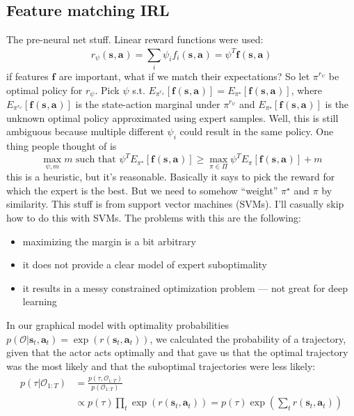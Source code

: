 \documentclass{report}
\begin{document}
\subsection{Feature matching IRL}
The pre-neural net stuff.
Linear reward functions were used:
\begin{equation}
		r_{ \psi } (\bm{s}_{}, \bm{a}_{} ) =
		\sum_{i}^{} \psi_{ i } f_{ i } (\bm{s}_{}, \bm{a}_{} ) = \psi^{ T } \bm{f}_{} (\bm{s}_{}, \bm{a}_{} )
\end{equation}
if features $ \bm{f}_{}  $ are important, what if we match their expectations?
So let $ \pi^{ r_{ \psi } }  $ be optimal policy for $ r_{ \psi }  $.
Pick $ \psi  $ s.t. $   
E_{ \pi^{ r_{ \psi } } } \left[ \bm{f}_{} (\bm{s}_{}, \bm{a}_{} )  \right] 
= E_{ \pi^{ \star } } \left[ \bm{f}_{} (\bm{s}_{}, \bm{a}_{} ) \right] $,
where $ E_{ \pi^{ r_{ \psi } } } \left[ \bm{f}_{} (\bm{s}_{}, \bm{a}_{} )  \right]  $ is the state-action marginal under $ \pi^{ r_{ \psi } }  $ 
and  $ E_{ \pi^{ \star } } \left[ \bm{f}_{} (\bm{s}_{}, \bm{a}_{} ) \right]   $ is the unknown optimal policy approximated using expert samples.
Well, this is still ambiguous because multiple different $ \psi_{ i }  $
could result in the same policy.
One thing people thought of is
\begin{equation}
		\max_{\psi, m} m \text{ such that } \psi^{ T } E_{ \pi^{ \star } } \left[ \bm{f}_{}(\bm{s}_{}, \bm{a}_{} ) \right] 
		\geq \max_{\pi \in \Pi} \psi^{ T } E_{ \pi } \left[ \bm{f}_{}(\bm{s}_{}, \bm{a}_{} ) \right]  +m
\end{equation}
this is a heuristic, but it's reasonable. Basically it says to pick the reward for which the expert is the best.
But we need to somehow ``weight'' $ \pi^{ \star }  $ and $ \pi  $ by similarity.
This stuff is from support vector machines (SVMs).
I'll casually skip how to do this with SVMs.
The problems with this are the following:
\begin{itemize}
		\item maximizing the margin is a bit arbitrary
		\item it does not provide a clear model of expert suboptimality 
		\item it results in a messy constrained optimization problem --- not great for deep learning
\end{itemize}

In our graphical model with optimality probabilities $ p (\mathcal{O}| \bm{s}_{t}, \bm{a}_{t} ) = \exp (r (\bm{s}_{t}, \bm{a}_{t} ))  $,
we calculated the probability of a trajectory, given that the actor acts optimally and that gave us
that the optimal trajectory was the most likely and that the suboptimal trajectories were less likely:
\begin{align}
		p (\tau|\mathcal{O}_{ 1:T }) &= \frac{p (\tau, \mathcal{O}_{ 1:T })}{p (\mathcal{O}_{ 1:T })}  \\
&\propto p (\tau) \prod_{t}^{} \exp (r (\bm{s}_{t}, \bm{a}_{t} )) = p (\tau) \exp \left( \sum_{t}^{} r (\bm{s}_{t}, \bm{a}_{t} ) \right)  
\end{align}
\end{document}
